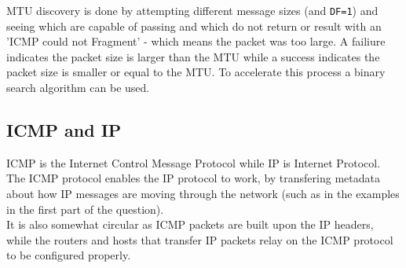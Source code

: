 MTU discovery is done by attempting different message sizes (and \texttt{DF=1}) and seeing which
are capable of passing and which do not return or result with an 'ICMP could not Fragment' - which
means the packet was too large.
A failiure indicates the packet size is larger than the MTU while 
a success indicates the packet size is smaller or equal to the MTU.
To accelerate this process a binary search algorithm can be used.

\subsection{ICMP and IP}
ICMP is the Internet Control Message Protocol while IP is Internet Protocol.\\
The ICMP protocol enables the IP protocol to work, by transfering
metadata about how IP messages are moving through the network (such as in the examples in the first
part of the question).\\
It is also somewhat circular as ICMP packets are built upon the IP headers,
while the routers and hosts that transfer IP packets relay on the ICMP
protocol to be configured properly.